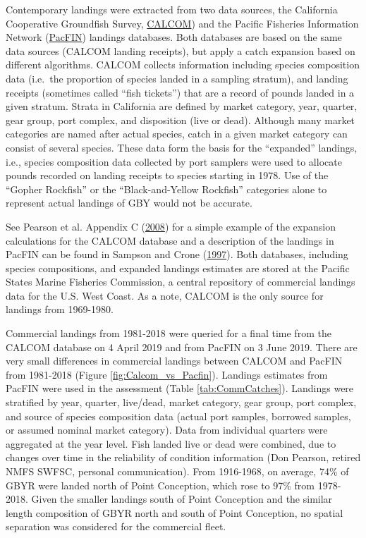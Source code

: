 \documentclass[12pt,]{article}
\begin{document}
Contemporary landings were extracted from two data sources, the
California Cooperative Groundfish Survey,
\href{https://calcom.psmfc.org/}{CALCOM}) and the Pacific Fisheries
Information Network (\href{https://pacfin.psmfc.org/}{PacFIN}) landings
databases. Both databases are based on the same data sources (CALCOM
landing receipts), but apply a catch expansion based on different
algorithms. CALCOM collects information including species composition
data (i.e.~the proportion of species landed in a sampling stratum), and
landing receipts (sometimes called ``fish tickets'') that are a record
of pounds landed in a given stratum. Strata in California are defined by
market category, year, quarter, gear group, port complex, and
disposition (live or dead). Although many market categories are named
after actual species, catch in a given market category can consist of
several species. These data form the basis for the ``expanded''
landings, i.e., species composition data collected by port samplers were
used to allocate pounds recorded on landing receipts to species starting
in 1978. Use of the ``Gopher Rockfish'' or the ``Black-and-Yellow
Rockfish'' categories alone to represent actual landings of GBY would
not be accurate.

See Pearson et al. Appendix C
(\protect\hyperlink{ref-Pearson2008}{2008}) for a simple example of the
expansion calculations for the CALCOM database and a description of the
landings in PacFIN can be found in Sampson and Crone
(\protect\hyperlink{ref-Sampson1997}{1997}). Both databases, including
species compositions, and expanded landings estimates are stored at the
Pacific States Marine Fisheries Commission, a central repository of
commercial landings data for the U.S. West Coast. As a note, CALCOM is
the only source for landings from 1969-1980.

Commercial landings from 1981-2018 were queried for a final time from
the CALCOM database on 4 April 2019 and from PacFIN on 3 June 2019.
There are very small differences in commercial landings between CALCOM
and PacFIN from 1981-2018 (Figure \ref{fig:Calcom_vs_Pacfin}). Landings
estimates from PacFIN were used in the assessment (Table
\ref{tab:CommCatches}). Landings were stratified by year, quarter,
live/dead, market category, gear group, port complex, and source of
species composition data (actual port samples, borrowed samples, or
assumed nominal market category). Data from individual quarters were
aggregated at the year level. Fish landed live or dead were combined,
due to changes over time in the reliability of condition information
(Don Pearson, retired NMFS SWFSC, personal communication). From
1916-1968, on average, 74\% of GBYR were landed north of Point
Conception, which rose to 97\% from 1978-2018. Given the smaller
landings south of Point Conception and the similar length composition of
GBYR north and south of Point Conception, no spatial separation was
considered for the commercial fleet.
\end{document}
